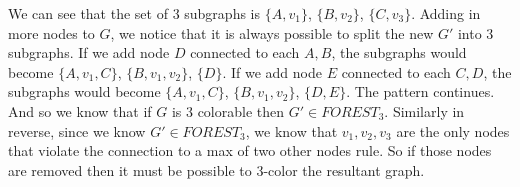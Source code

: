\documentclass[12pt]{article}
\begin{document}
We can see that the set of $3$ subgraphs is $\lbrace A, v_{1} \rbrace$, $\lbrace B, v_{2} \rbrace$, $\lbrace C, v_{3} \rbrace$. Adding in more nodes to $G$, we notice that it is always possible to split the new $G'$ into $3$ subgraphs. If we add node $D$ connected to each $A, B$, the subgraphs would become $\lbrace A, v_{1}, C \rbrace$, $\lbrace B, v_{1}, v_{2} \rbrace$, $\lbrace D \rbrace$. If we add node $E$ connected to each $C, D$, the subgraphs would become $\lbrace A, v_{1}, C \rbrace$, $\lbrace B, v_{1}, v_{2} \rbrace$, $\lbrace D, E \rbrace$. The pattern continues. And so we know that if $G$ is $3$ colorable then $G' \in FOREST_{3}$. Similarly in reverse, since we know $G' \in FOREST_{3}$, we know that $v_{1}, v_{2}, v_{3}$ are the only nodes that violate the connection to a max of two other nodes rule. So if those nodes are removed then it must be possible to $3$-color the resultant graph.





\enddocument
 
\end{document}

